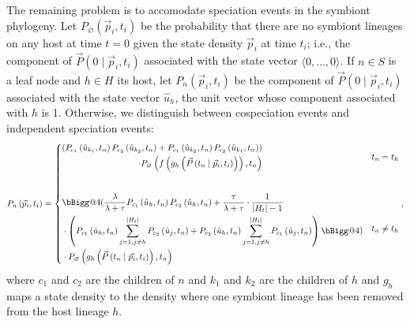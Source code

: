 \documentclass{article}
\makeatletter
\newcommand{\vast}{\bBigg@{4}}
\makeatother
\begin{document}
            The remaining problem is to accomodate speciation events in the
            symbiont phylogeny. Let $P_\varnothing\left(\vec{p}_i, t_i\right)$
            be the probability that there are no symbiont lineages on any host
            at time $t = 0$ given the state density $\vec{p}_i$ at time $t_i$;
            i.e., the component of $\vec{P}\left(0\mid\vec{p}_i, t_i\right)$
            associated with the state vector $\langle0,\dots,0\rangle$.  If $n
            \in S$ is a leaf node and $h \in H$ its host, let
            $P_n\left(\vec{p}_i, t_i\right)$ be the component of
            $\vec{P}\left(0\mid\vec{p}_i, t_i\right)$ associated with the state
            vector $\hat{u}_h$, the unit vector whose component associated with
            $h$ is 1. Otherwise, we distinguish between cospeciation events and
            independent speciation events:
            \begin{equation}
                P_n\left(\vec{p}_i, t_i\right) =
                \begin{cases}
                    \begin{aligned}
                        \left(P_{c_1}\left(\hat{u}_{k_1}, t_n\right)
                        P_{c_2}\left(\hat{u}_{k_2}, t_n\right) +
                        P_{c_1}\left(\hat{u}_{k_2}, t_n\right)
                        P_{c_2}\left(\hat{u}_{k_1}, t_n\right)\right) \\
                        \cdot P_\varnothing\left(f\left(g_h\left(\vec{P}\left(t_n\mid
                        \vec{p}_i, t_i\right)\right)\right), t_n\right)
                    \end{aligned} & t_n = t_h \\[8ex]
                    \begin{aligned}
                        & \vast( \frac{\lambda}{\lambda+\tau} P_{c_1}\left(\hat{u}_h,
                        t_n\right) P_{c_2}\left(\hat{u}_h, t_n\right) +
                        \frac{\tau}{\lambda+\tau}\cdot
                        \frac{1}{\lvert{H_t}\rvert-1} \\
                        &\cdot\left(P_{c_1}\left(\hat{u}_h, t_n\right)\sum_{j=1,j\neq
                        h}^{\lvert{H_t}\rvert}{P_{c_2}\left(\hat{u}_j,
                        t_n\right)} + P_{c_2}\left(\hat{u}_h, t_n\right)
                        \sum_{j=1,j\neq h}^{\lvert{H_t}\rvert}
                        {P_{c_1}\left(\hat{u}_j,t_n\right)}\right)\vast) \\
                        & \cdot P_\varnothing\left(g_h\left(\vec{P}\left(t_n\mid\vec{p}_i,
                        t_i\right)\right), t_n\right)
                    \end{aligned}
                    & t_n \neq t_h
                \end{cases},
            \end{equation}
            where $c_1$ and $c_2$ are the children of $n$ and $k_1$ and $k_2$
            are the children of $h$ and $g_h$ maps a state density to the
            density where one symbiont lineage has been removed from the host
            lineage $h$.
\end{document}
